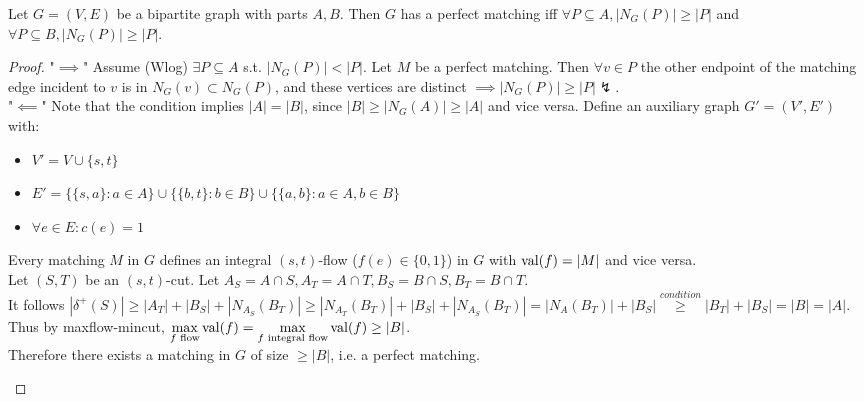 \begin{theorem}\label{4.17}
    Let $G=(V,E)$ be a bipartite graph with parts $A,B$. Then $G$ has a perfect matching iff $\forall P\subseteq A,|N_G(P)|\geq|P|$ and $\forall P\subseteq B,|N_G(P)|\geq|P|$.
\end{theorem}
\begin{proof}
    "$\implies$" Assume (Wlog) $\exists P\subseteq A$ s.t. $|N_G(P)|<|P|$. Let $M$ be a perfect matching. Then $\forall v\in P$ the other endpoint of the matching edge incident to $v$ is in $N_G(v)\subset N_G(P)$, and these vertices are distinct $\implies|N_G(P)|\geq|P|\lightning$.\\
    "$\impliedby$" Note that the condition implies $|A|=|B|$, since $|B|\geq|N_G(A)|\geq|A|$ and vice versa. Define an auxiliary graph $G'=(V',E')$ with:\\
    \begin{itemize}
        \item $V'=V\cup\{s,t\}$
        \item $E'=\{\{s,a\}:a\in A\}\cup \{\{b,t\}:b\in B\}\cup\{\{a,b\}:a\in A,b\in B\}$
        \item $\forall e\in E: c(e)=1$
    \end{itemize}
    Every matching $M$ in $G$ defines an integral $(s,t)$-flow ($f(e)\in\{0,1\}$) in $G$ with $\operatorname{val}(f)=|M|$ and vice versa.\\
    Let $(S,T)$ be an $(s,t)$-cut. Let $A_S=A\cap S,A_T=A\cap T,B_S=B\cap S,B_T=B\cap T$.\\
    It follows $|\delta^+(S)|\geq |A_T|+|B_S|+|N_{A_S}(B_T)|\geq|N_{A_T}(B_T)|+|B_S|+|N_{A_S}(B_T)|=|N_A(B_T)|+|B_S|\stackrel{condition}{\geq}|B_T|+|B_S|=|B|=|A|$.\\
    Thus by maxflow-mincut, $\max\limits_{f\text{ flow}}\operatorname{val}(f)=\max\limits_{f\text{ integral flow}}\operatorname{val}(f)\geq|B|$.\\
    Therefore there exists a matching in $G$ of size $\geq |B|$, i.e. a perfect matching.

    \begin{center}
\end{center}
\end{proof}
